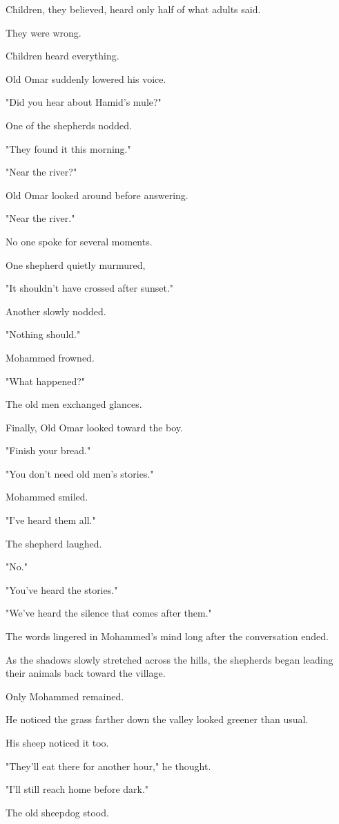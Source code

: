\documentclass[12pt,openany]{book}
\begin{document}
Children, they believed, heard only half of what adults said.

They were wrong.

Children heard everything.

Old Omar suddenly lowered his voice.

"Did you hear about Hamid's mule?"

One of the shepherds nodded.

"They found it this morning."

"Near the river?"

Old Omar looked around before answering.

"Near the river."

No one spoke for several moments.

One shepherd quietly murmured,

"It shouldn't have crossed after sunset."

Another slowly nodded.

"Nothing should."

Mohammed frowned.

"What happened?"

The old men exchanged glances.

Finally, Old Omar looked toward the boy.

"Finish your bread."

"You don't need old men's stories."

Mohammed smiled.

"I've heard them all."

The shepherd laughed.

"No."

"You've heard the stories."

"We've heard the silence that comes after them."

The words lingered in Mohammed's mind long after the conversation ended.

As the shadows slowly stretched across the hills, the shepherds began leading their animals back toward the village.

Only Mohammed remained.

He noticed the grass farther down the valley looked greener than usual.

His sheep noticed it too.

"They'll eat there for another hour," he thought.

"I'll still reach home before dark."

The old sheepdog stood.
\end{document}
